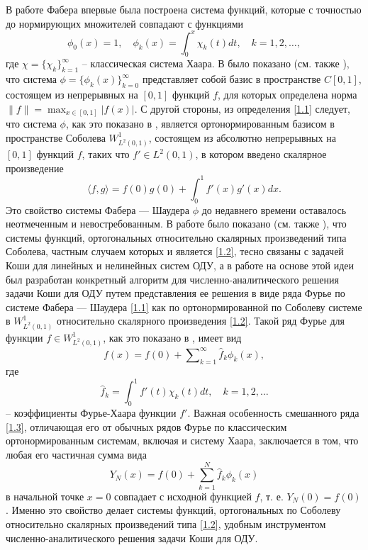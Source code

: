 \Introduction
В работе Фабера \cite{Faber} впервые была построена система функций, которые с точностью до нормирующих множителей совпадают с функциями
\begin{equation}\label{1.1}
\phi_{0}(x)=1, \quad \phi_{k}(x)=\int_{0}^{x}\chi_k(t)dt, \quad k=1,2,\ldots,
\end{equation}
где  $\chi=\{\chi_k\}_{k=1}^\infty$ --   классическая система Хаара.
В \cite{Faber} было показано (см. также \cite{Shauder}), что  система $\phi=\{\phi_k(x)\}_{k=0}^\infty$  представляет собой базис в пространстве $C[0,1]$, состоящем из непрерывных на $[0,1]$ функций $f$, для которых определена норма $\|f\|=\max_{x\in[0,1]}|f(x)|$. С другой стороны, из определения \eqref{1.1} следует, что система $\phi$, как это показано в \cite{SharIzv2018},  является ортонормированным базисом в  пространстве Соболева $W^1_{L^2(0,1)}$, состоящем из абсолютно непрерывных на $[0,1]$ функций $f$, таких что $f'\in L^2(0,1)$, в котором введено скалярное произведение
\begin{equation}\label{1.2}
\langle f,g\rangle=f(0)g(0)+\int_{0}^1f'(x)g'(x)dx.
\end{equation}
Это свойство системы Фабера --- Шаудера $\phi$ до недавнего времени \cite{SharIzv2018} оставалось неотмеченным и невостребованным. В работе \cite{SharIzv2018} было показано (см. также \cite{SharDiffur2018}), что системы функций, ортогональных относительно скалярных произведений типа Соболева, частным случаем которых и является \eqref{1.2}, тесно связаны с задачей Коши для линейных и нелинейных систем ОДУ, а в работе  \cite{MMG2016} на основе этой идеи был разработан конкретный алгоритм для численно-аналитического решения задачи Коши для  ОДУ путем представления ее решения в виде ряда Фурье по системе Фабера --- Шаудера \eqref{1.1} как по ортонормированной по Соболеву системе в $W^1_{L^2(0,1)}$ относительно скалярного произведения \eqref{1.2}. Такой ряд Фурье для функции $f\in W^1_{L^2(0,1)}$, как это показано в \cite{SharIzv2018}, имеет вид
\begin{equation}\label{1.3}
f(x)=f(0)+\sum\nolimits_{k=1}^\infty \hat f_k \phi_{k}(x),
\end{equation}
где
\begin{equation}\label{1.4}
\hat f_k=\int_{0}^1f'(t)\chi_{k}(t)dt, \quad k=1,2,\ldots
\end{equation}
-- коэффициенты Фурье-Хаара функции $f'$. Важная особенность смешанного ряда \eqref{1.3}, отличающая его от обычных рядов Фурье по классическим ортонормированным системам, включая и систему Хаара, заключается в том, что любая его частичная сумма вида
\begin{equation}\label{1.5}
Y_N(x)=f(0)+\sum_{k=1}^N \hat f_k \phi_{k}(x)
\end{equation}
в начальной точке $x=0$ совпадает с исходной функцией $f$, т. е. $Y_N(0)=f(0)$. Именно это свойство делает системы функций, ортогональных по Соболеву относительно скалярных произведений типа \eqref{1.2}, удобным инструментом  численно-аналитического решения задачи Коши для ОДУ.

